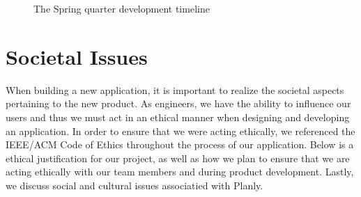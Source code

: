 \begin{figure}[h]
\centering
  \begin{gantt}{17}{10}
    \begin{ganttitle}
    \end{ganttitle}
    \begin{ganttitle}
    \end{ganttitle}

    \end{gantt}
    \caption{The Spring quarter development timeline}
\end{figure}
\FloatBarrier

\section{Societal Issues}
When building a new application, it is important to realize the societal aspects pertaining to the new product. As engineers, we have the ability to influence our users and thus we must act in an ethical manner when designing and developing an application. In order to ensure that we were acting ethically, we referenced the IEEE/ACM Code of Ethics\cite{ethicscode} throughout the process of our application. Below is a ethical justification for our project, as well as how we plan to ensure that we are acting ethically with our team members and during product development. Lastly, we discuss social and cultural issues associatied with Planly. 
